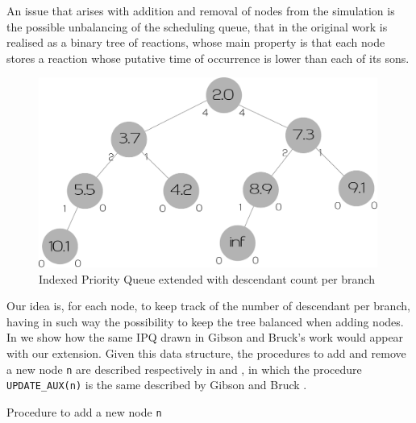\documentclass[12pt,a4paper,twoside,openright]{book}
\begin{document}
An issue that arises with addition and removal of nodes from the simulation is the possible unbalancing of the scheduling queue, that in the original work is realised as a binary tree of reactions, whose main property is that each node stores a reaction whose putative time of occurrence is lower than each of its sons.

\begin{figure}%
  \begin{center}
    \includegraphics[width=0.99\textwidth]{img/extipq.pdf}
    \caption{Indexed Priority Queue extended with descendant count per branch}
    \label{img:ipq}
  \end{center}
\end{figure}

Our idea is, for each node, to keep track of the number of descendant per branch, having in such way the possibility to keep the tree balanced when adding nodes. In  we show how the same IPQ drawn in Gibson and Bruck's work \cite{gibson2000} would appear with our extension. Given this data structure, the procedures to add and remove a new node \texttt{n} are described respectively in  and , in which the procedure \texttt{UPDATE\_AUX(n)} is the same described by Gibson and Bruck \cite{gibson2000}.

\begin{algorithm}
\begin{distribalgo}[1]
\vspace{5pt}
\ELSE
    \ELSE
    \ENDIF
    \ELSE
    \ENDIF
  \ENDWHILE
\ENDIF
\caption{Procedure to add a new node \texttt{n}}
\label{algo:newnode}
\end{distribalgo}
\end{algorithm}
\end{document}
